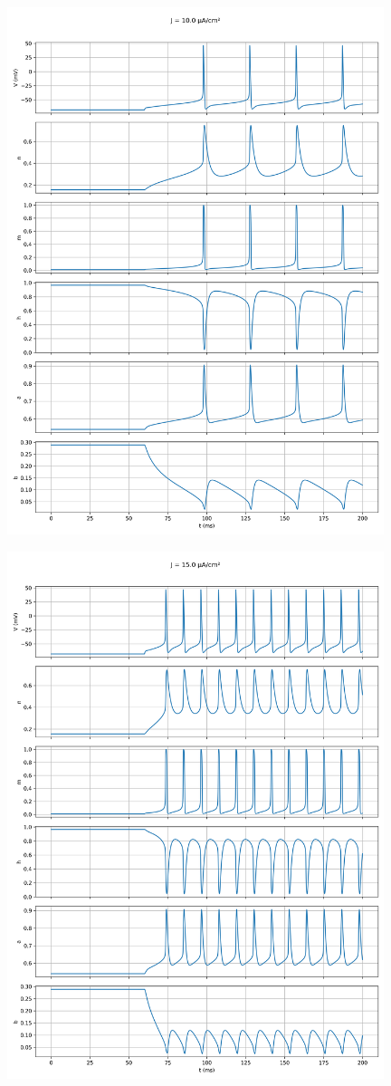 \documentclass[english,11pt,a4paper]{article}
\begin{document}
	\begin{figure}[H]
	\centering
	\includegraphics[width=11cm]{../figures/ex_1b_2.png}	
	\end{figure}

	\begin{figure}[H]
	\centering
	\includegraphics[width=11cm]{../figures/ex_1b_3.png}	
	\end{figure}
\end{document}
